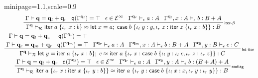 \documentclass[acmsmall,screen,anonymous,review]{acmart}
\newcommand{\mc}[1]{\ensuremath{\mathcal{#1}}}
\newcommand{\mb}[1]{\ensuremath{\mathbf{#1}}}
\newcommand{\ms}[1]{\ensuremath{\mathsf{#1}}}
\newcommand{\lto}{:}
\newcommand{\linl}[1]{\iota_l\;{#1}}
\newcommand{\linr}[1]{\iota_r\;{#1}}
\newcommand{\letexpr}[3]{\ensuremath{\ms{let}\;#1 = #2;\;#3}}
\newcommand{\caseexpr}[5]{\ms{case}\;#1\;\{\linl{#2} \lto #3, \linr{#4} \lto #5\}}
\newcommand{\liter}[3]{\ms{iter}\;#1\;\{ \linr{#2} \lto #3 \}}
\newcommand{\einf}[1]{#1 \in \mc{E}^\infty}
\newcommand{\qsp}[4]{#1 \vdash #2 = #3 + #4}
\newcommand{\rle}[1]{{\scriptsize\textsf{#1}}}
\newcommand{\hasty}[4]{#1 \vdash_{#2} #3: {#4}}
\newcommand{\teqv}{\approx}
\newcommand{\tmeq}[5]{#1 \vdash_{#2} #3 \teqv #4 : {#5}}
\newcommand{\alquant}{\ms{q}}
\begin{document}
\begin{figure}
  \begin{adjustbox}{minipage=1.1\textwidth,scale=0.9}
  \begin{gather*}
    \prftree[r]{\rle{iter-$\beta$}}
      {\qsp{\Gamma}{\mb{q}}{\mb{q}_l}{\mb{q}_r}}
      {\alquant(\Gamma^{\mb{q}_l}) = \top}
      {\einf{\epsilon}}
      {\hasty{\Gamma^{\mb{q}_r}}{\epsilon}{a}{A}}
      {\hasty{\Gamma^{\mb{q}_l}, x : A}{\epsilon}{b}{B + A}}
      {\tmeq
        {\Gamma^{\mb{q}}}{\mc{R}}{\liter{a}{x}{b}}
        {\letexpr{x}{a}{\caseexpr{b}{y}{y}{z}{\liter{z}{x}{b}}}}{B}}
    \\
    \prftree[r]{\rle{let-iter}}
      {
      \prfStackPremises
      {\qsp{\Gamma}{\mb{q}}{\mb{q}_l}{\mb{q}_c}}
      {\qsp{\Gamma}{\mb{q}_c}{\mb{q}_m}{\mb{q}_r}}
      }
      {
      \prfStackPremises
      {\alquant(\Gamma^{\mb{q}_l}) = \top}
      {\alquant(\Gamma^{\mb{q}_m}) = \top}
      }
      {\hasty{\Gamma^{\mb{q}_r}}{\epsilon}{a}{A}}
      {\hasty{\Gamma^{\mb{q}_m}, x : A}{\epsilon}{b}{B + A}}
      {\hasty{\Gamma^{\mb{q}_l}, y : B}{\epsilon}{c}{C}}
      {\tmeq{\Gamma^{\mb{q}}}{\mc{R}}
        {\letexpr{y}{\liter{a}{x}{b}}{c}}
        {\liter{a}{x}{\caseexpr{b}{y}{\linl{c}}{z}{\linr{z}}}}
        {C}
      } \\
    \prftree[r]{\rle{codiag}}
      {\qsp{\Gamma}{\mb{q}}{\mb{q}_l}{\mb{q}_r}}
      {\alquant(\Gamma^{\mb{q}_l}) = \top}
      {\einf{\epsilon}}
      {\hasty{\Gamma^{\mb{q}_r}}{\epsilon}{a}{A}}
      {\hasty{\Gamma^{\mb{q}_l}, y : A}{\epsilon}{b}{(B + A) + A}}
      {\tmeq
        {\Gamma^{\mb{q}}}{\mc{R}}{\liter{a}{x}{\liter{x}{y}{b}}}
        {\liter{a}{y}{\caseexpr{b}{x}{x}{y}{\linr{y}}}}{B}} \\
  \end{gather*}

\end{adjustbox}
\end{figure}
\end{document}
